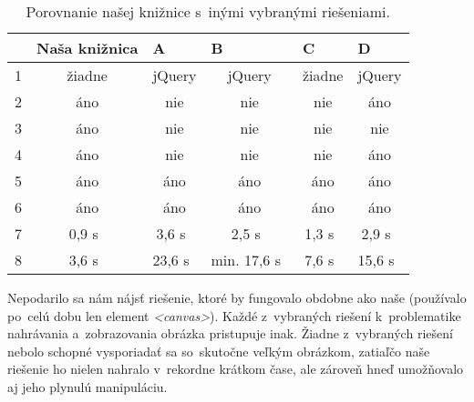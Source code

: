 \begin{table}[!htb]
	\centering
	\begin{tabular}{@{}|l|c|c|c|c|c|@{}}
	\toprule
		  		   & \multicolumn{1}{l|}{Naša knižnica} & \multicolumn{1}{l|}{A} & \multicolumn{1}{l|}{B} & \multicolumn{1}{l|}{C} & \multicolumn{1}{l|}{D} \\ \midrule
	1              & žiadne                & jQuery                 & jQuery                 & žiadne                 & jQuery                 \\ \midrule
	2 		       & áno                   & nie                    & nie                    & nie                    & áno                    \\ \midrule
	3  			   & áno                   & nie                    & nie                    & nie                    & nie                    \\ \midrule
	4			   & áno                   & nie                    & nie                    & nie                    & áno                    \\ \midrule
	5		       & áno                   & áno                    & áno                    & áno                    & áno                    \\ \midrule
	6              & áno                   & áno                    & áno                    & áno                    & áno                    \\ \midrule
	7 			   & 0,9 s~                & 3,6 s~                 & 2,5 s~                 & 1,3 s~                 & 2,9 s~                 \\ \midrule
	8   		   & 3,6 s~                & 23,6 s~                & min. 17,6 s~			 & 7,6 s~                 & 15,6 s~                \\ \bottomrule
	\end{tabular}
	\caption{Porovnanie našej knižnice s~inými vybranými riešeniami.}
	\label{my-label}
\end{table}

Nepodarilo sa nám nájsť riešenie, ktoré by fungovalo obdobne ako naše (používalo po~celú dobu len element \emph{<canvas>}). Každé z~vybraných riešení k~problematike nahrávania a~zobrazovania obrázka pristupuje inak. Žiadne z~vybraných riešení nebolo schopné vysporiadať sa so~skutočne veľkým obrázkom, zatiaľčo naše riešenie ho nielen nahralo v~rekordne krátkom čase, ale zároveň hneď umožňovalo aj jeho plynulú manipuláciu.